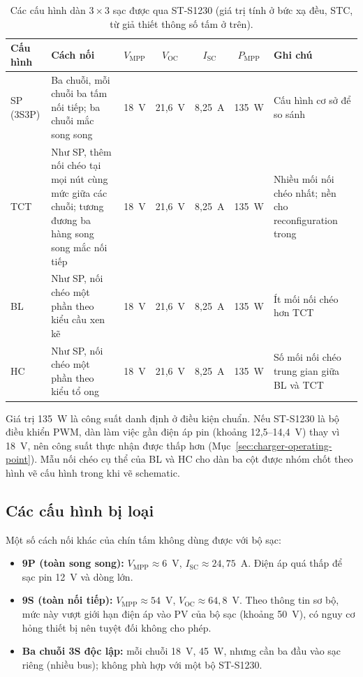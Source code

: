 \begin{table}[H]
\centering
\caption{Các cấu hình dàn \(3\times3\) sạc được qua ST-S1230 (giá trị tính ở bức xạ đều, STC, từ giả thiết thông số tấm ở trên).}
\label{tab:group-a}
\small
\begin{tabularx}{\linewidth}{@{}l>{\raggedright\arraybackslash}Xcccc>{\raggedright\arraybackslash}X@{}}
\hline
\textbf{Cấu hình} & \textbf{Cách nối} & \(V_{\mathrm{MPP}}\) & \(V_{\mathrm{OC}}\) & \(I_{\mathrm{SC}}\) & \(P_{\mathrm{MPP}}\) & \textbf{Ghi chú} \\
\hline
SP (3S3P) & Ba chuỗi, mỗi chuỗi ba tấm nối tiếp; ba chuỗi mắc song song & 18~V & 21,6~V & 8,25~A & 135~W & Cấu hình cơ sở để so sánh \\
TCT & Như SP, thêm nối chéo tại mọi nút cùng mức giữa các chuỗi; tương đương ba hàng song song mắc nối tiếp & 18~V & 21,6~V & 8,25~A & 135~W & Nhiều mối nối chéo nhất; nền cho reconfiguration trong \cite{thanh} \\
BL & Như SP, nối chéo một phần theo kiểu cầu xen kẽ & 18~V & 21,6~V & 8,25~A & 135~W & Ít mối nối chéo hơn TCT \\
HC & Như SP, nối chéo một phần theo kiểu tổ ong & 18~V & 21,6~V & 8,25~A & 135~W & Số mối nối chéo trung gian giữa BL và TCT \\
\hline
\end{tabularx}
\end{table}

Giá trị 135~W là công suất danh định ở điều kiện chuẩn. Nếu ST-S1230 là bộ điều khiển PWM, dàn làm việc gần điện áp pin (khoảng 12,5--14,4~V) thay vì 18~V, nên công suất thực nhận được thấp hơn (Mục~\ref{sec:charger-operating-point}). Mẫu nối chéo cụ thể của BL và HC cho dàn ba cột được nhóm chốt theo hình vẽ cấu hình trong \cite{thanh} khi vẽ schematic.

\subsection{Các cấu hình bị loại}

Một số cách nối khác của chín tấm không dùng được với bộ sạc:

\begin{itemize}
    \item \textbf{9P (toàn song song):} \(V_{\mathrm{MPP}}\approx6\)~V, \(I_{\mathrm{SC}}\approx24{,}75\)~A. Điện áp quá thấp để sạc pin 12~V và dòng lớn.
    \item \textbf{9S (toàn nối tiếp):} \(V_{\mathrm{MPP}}\approx54\)~V, \(V_{\mathrm{OC}}\approx64{,}8\)~V. Theo thông tin sơ bộ, mức này vượt giới hạn điện áp vào PV của bộ sạc (khoảng 50~V), có nguy cơ hỏng thiết bị nên tuyệt đối không cho phép.
    \item \textbf{Ba chuỗi 3S độc lập:} mỗi chuỗi 18~V, 45~W, nhưng cần ba đầu vào sạc riêng (nhiều bus); không phù hợp với một bộ ST-S1230.
\end{itemize}

